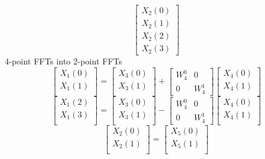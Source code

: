 \documentclass[journal,12pt,twocolumn]{IEEEtran}
\numberwithin{equation}{section}
\renewcommand\thesection{\arabic{section}}
\begin{document}
\begin{enumerate}[label=\arabic*.,ref=\thesection.\theenumi]
\begin{equation}
\begin{bmatrix}
X_{2}(0) \\ 
X_{2}(1) \\ 
X_{2}(2) \\
X_{2}(3)
\end{bmatrix}
\end{equation}
4-point FFTs into 2-point FFTs
\begin{equation}
\begin{bmatrix}
X_{1}(0) \\ 
X_{1}(1)\\ 
\end{bmatrix}
=
\begin{bmatrix}
X_{3}(0) \\ 
X_{3}(1)\\ 
\end{bmatrix}
+
\begin{bmatrix}
W^{0}_{4} & 0\\
0 & W^{1}_{4}
\end{bmatrix}
\begin{bmatrix}
X_{4}(0) \\ 
X_{4}(1) \\ 
\end{bmatrix}
\end{equation}
\begin{equation}
\begin{bmatrix}
X_{1}(2) \\ 
X_{1}(3)\\ 
\end{bmatrix}
=
\begin{bmatrix}
X_{3}(0) \\ 
X_{3}(1)\\ 
\end{bmatrix}
-
\begin{bmatrix}
W^{0}_{4} & 0\\
0 & W^{1}_{4}
\end{bmatrix}
\begin{bmatrix}
X_{4}(0) \\ 
X_{4}(1) \\ 
\end{bmatrix}
\end{equation}
\begin{equation}
\begin{bmatrix}
X_{2}(0) \\ 
X_{2}(1)\\ 
\end{bmatrix}
=
\begin{bmatrix}
X_{5}(0) \\ 
X_{5}(1)\\ 

\end{bmatrix}
\end{equation}
\end{enumerate}
\end{document}
